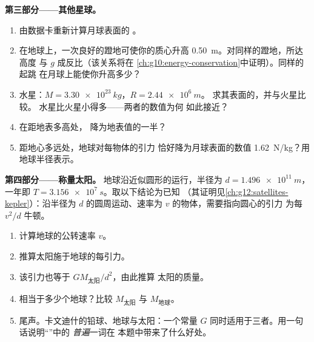 \begin{problem}
\medskip
\noindent\textbf{第三部分——其他星球。}
\begin{enumerate}[resume]
  \item 由数据卡重新计算月球表面的
        。
  \item 在地球上，一次良好的蹬地可使你的质心升高
        \qty{0.50}{m}。对同样的蹬地，所达高度
        与 $g$ 成反比（该关系将在
        \cref{ch:g10:energy-conservation}中证明）。同样的起跳
        在月球上能使你升高多少？
  \item 水星：$M = \qty{3.30e23}{kg}$，$R = \qty{2.44e6}{m}$。
        求其表面的，并与火星比较。
        水星比火星小得多——两者的数值为何
        如此接近？
  \item 在距地表多高处，
        降为地表值的一半？
  \item 距地心多远处，地球对每物体的引力
        恰好降为月球表面的数值
        \qty{1.62}{N/kg}？用地球半径表示。
\end{enumerate}

\medskip
\noindent\textbf{第四部分——称量太阳。}
地球沿近似圆形的运行，半径为
$d = \qty{1.496e11}{m}$，一年即 $T = \qty{3.156e7}{s}$。取以下结论为已知
（其证明见\cref{ch:g12:satellites-kepler}）：沿半径为
$d$ 的圆周运动、速率为 $v$ 的物体，需要指向圆心的引力
为每 $v^2/d$ 牛顿。
\begin{enumerate}[resume]
  \item 计算地球的公转速率 $v$。
  \item 推算太阳施于地球的每引力。
  \item 该引力也等于 $G M_{\text{太阳}} / d^2$，由此推算
        太阳的质量。
  \item 相当于多少个地球？比较 $M_{\text{太阳}}$ 与
        $M_{\text{地球}}$。
  \item 尾声。卡文迪什的铅球、地球与太阳：一个常量
        $G$ 同时适用于三者。用一句话说明“”中的
        \emph{普遍}一词在
        本题中带来了什么好处。
\end{enumerate}
\end{problem}

